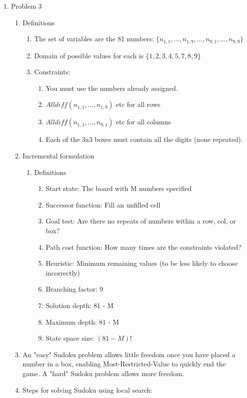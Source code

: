 \documentclass[11pt]{article}
\begin{document}
\begin{enumerate}
\item Problem 3
\begin{enumerate}
\item Definitions
\begin{enumerate}
\item The set of variables are the 81 numbers: $\{n_{1,1}, \ldots, n_{1,9}, \ldots, n_{9, 1}, \ldots, n_{9, 9}\}$
\item Domain of possible values for each is $\{1, 2, 3, 4, 5, 7, 8, 9\}$
\item Constraints:
\begin{enumerate}
\item You must use the numbers already assigned.
\item $Alldiff( n_{1,1}, \ldots, n_{1, 9} )$ etc for all rows
\item $Alldiff( n_{1,1}, \ldots, n_{9, 1} )$ etc for all columns
\item Each of the 3x3 boxes must contain all the digits (none repeated).
\end{enumerate}
\end{enumerate}
\item Incremental formulation
\begin{enumerate}
\item Definitions
\begin{enumerate}
\item Start state: The board with M numbers specified
\item Successor function: Fill an unfilled cell
\item Goal test: Are there no repeats of numbers within a row, col, or box? 
\item Path cost function: How many times are the constraints violated? 
\item Heuristic: Minimum remaining values (to be less likely to choose incorrectly)
\item Branching factor: 9
\item Solution depth: 81 - M
\item Maximum depth: 81 - M
\item State space size: $(81-M)!$
\end{enumerate}
\end{enumerate}
\item An "easy" Sudoku problem allows little freedom once you have placed a number in a box, enabling Most-Restricted-Value to quickly end the game. A "hard" Sudoku problem allows more freedom.
\item Steps for solving Sudoku using local search:

\end{enumerate}
\end{enumerate}
\end{document}
